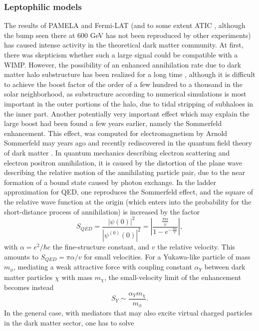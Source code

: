 \documentclass[10pt,aps,pra,reprint,amsmath,amsfonts,amssymb,showpacs]{revtex4-1}
\begin{document}
\subsubsection{Leptophilic models}
\label{sect:LP}
The results of PAMELA \cite{Adriani:2008zr} and Fermi-LAT
\cite{Abdo:2009zk} (and to some extent ATIC
\cite{2008Natur.456..362C}, although the bump seen there at 600 GeV
has not been reproduced by other experiments) has caused intense
activity in the theoretical dark matter community. At first, there was
skepticism whether such a large signal could be compatible with a
WIMP. However, the possibility of an enhanced annihilation rate due to
dark matter halo substructure has been realized for a long time
\cite{1993ApJ...411..439S,Bergstrom:1998zs,Moore:1999nt}, although it
is difficult to achieve the boost factor of the order of a few
hundred to a thousand in the solar neighborhood, as substructure
according to numerical simulations is most important in the outer
portions of the halo, due to tidal stripping of subhaloes in the inner
part. Another potentially very important effect which may explain the
large boost had been found a few years earlier, namely the Sommerfeld
enhancement. This effect, was computed for electromagnetism by Arnold
Sommerfeld may years ago \cite{sommerfeld} and recently rediscovered
in the quantum field theory of dark matter
\cite{2005PhRvD..71f3528H,2007NuPhB.787..152C,2009PhRvD..79a5014A}.
In quantum mechanics describing electron scattering and electron
positron annihilation, it is caused by the distortion of the plane
wave describing the relative motion of the annihilating particle pair,
due to the near formation of a bound state caused by photon
exchange. In the ladder approximation for QED, one reproduces the
Sommerfeld effect, and the square of the relative wave function at the
origin (which enters into the probability for the short-distance
process of annihilation) is increased by the factor
\cite{2009PhRvD..79a5014A}
$$
S_{QED}=\frac{|\psi(0)|^2}{|\psi^{(0)}(0)|^2}=|\frac{\frac{\pi\alpha}{v}}{1-e^{-\frac{\pi\alpha}{v}}}|,
$$ with $\alpha =e^2/\hbar c$ the fine-structure constant, and $v$ the
relative velocity. This amounts to $S_{QED}=\pi\alpha/v$ for small
velocities. For a Yukawa-like particle of mass $m_\phi$, mediating a
weak attractive force with coupling constant $\alpha_Y$ between dark
matter particles $\chi$ with mass $m_\chi$, the small-velocity limit
of the enhancement becomes instead
$$
S_Y\sim\frac{\alpha_Y m_\chi}{m_\phi}.
$$ In the general case, with mediators that may also excite virtual
charged particles in the dark matter sector, one has to solve
\end{document}

